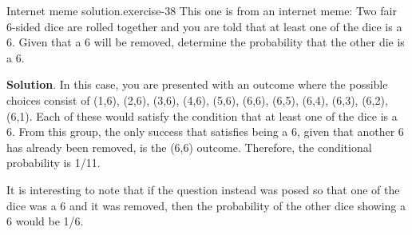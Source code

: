 \documentclass[10pt,]{book}
\numberwithin{equation}{section}
\begin{document}
\begin{inlineexercise}{Internet meme solution.}{exercise-38}%
\hypertarget{p-619}{}%
This one is from an internet meme:  Two fair 6-sided dice are rolled together and you are told that at least one of the dice is a 6. Given that a 6 will be removed, determine the probability that the other die is a 6.%
\par\smallskip%
\noindent\textbf{Solution}.\hypertarget{solution-16}{}\quad%
\hypertarget{p-620}{}%
In this case, you are presented with an outcome where the possible choices consist of (1,6), (2,6), (3,6), (4,6), (5,6), (6,6), (6,5), (6,4), (6,3), (6,2), (6,1).  Each of these would satisfy the condition that at least one of the dice is a 6. From this group, the only success that satisfies being a 6, given that another 6 has already been removed, is the (6,6) outcome. Therefore, the conditional probability is 1/11.%
\par
\hypertarget{p-621}{}%
It is interesting to note that if the question instead was posed so that one of the dice was a 6 and it was removed, then the probability of the other dice showing a 6 would be 1/6.%
\end{inlineexercise}
%
\par
\hypertarget{p-622}{}%
\end{document}
